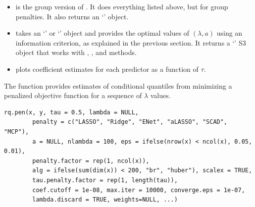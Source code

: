 \begin{itemize}
\item
   is the group version of . It does everything listed above, but for group penalties. It also returns an `' object.
\item
   takes an `' or `' object and provides the optimal values of \((\lambda,a)\) using an information criterion, as explained in the previous section. It returns a `' S3 object that works with , , and  methods.
\item
   plots coefficient estimates for each predictor as a function of \(\tau\).
\end{itemize}

The  function provides estimates of conditional quantiles from minimizing a penalized objective function for a sequence of \(\lambda\) values.

\begin{verbatim}
rq.pen(x, y, tau = 0.5, lambda = NULL,
        penalty = c("LASSO", "Ridge", "ENet", "aLASSO", "SCAD", "MCP"),
        a = NULL, nlambda = 100, eps = ifelse(nrow(x) < ncol(x), 0.05, 0.01),
        penalty.factor = rep(1, ncol(x)), 
        alg = ifelse(sum(dim(x)) < 200, "br", "huber"), scalex = TRUE,
        tau.penalty.factor = rep(1, length(tau)), 
        coef.cutoff = 1e-08, max.iter = 10000, converge.eps = 1e-07, 
        lambda.discard = TRUE, weights=NULL, ...)
\end{verbatim}

